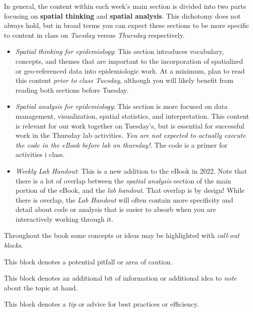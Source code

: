 \documentclass[
]{book}
\providecommand{\tightlist}{%
  \setlength{\itemsep}{0pt}\setlength{\parskip}{0pt}}
\newenvironment{rmdcaution}[1]
  {
  \begin{itemize}
  \renewcommand{\labelitemi}{
    \raisebox{-.7\height}[0pt][0pt]{
      {\setkeys{Gin}{width=3em,keepaspectratio}\texttt{[image: images/\#1]}}
    }
  }
  \setlength{\fboxsep}{1em}
  \begin{caution}
  \item
  }
  {
  \end{caution}
  \end{itemize}
  }
\newenvironment{rmdnote}[1]
  {
  \begin{itemize}
  \renewcommand{\labelitemi}{
    \raisebox{-.7\height}[0pt][0pt]{
      {\setkeys{Gin}{width=3em,keepaspectratio}\texttt{[image: images/\#1]}}
    }
  }
  \setlength{\fboxsep}{1em}
  \begin{note}
  \item
  }
  {
  \end{note}
  \end{itemize}
  }
\newenvironment{rmdtip}[1]
  {
  \begin{itemize}
  \renewcommand{\labelitemi}{
    \raisebox{-.7\height}[0pt][0pt]{
      {\setkeys{Gin}{width=3em,keepaspectratio}\texttt{[image: images/\#1]}}
    }
  }
  \setlength{\fboxsep}{1em}
  \begin{tip}
  \item
  }
  {
  \end{tip}
  \end{itemize}
  }
\begin{document}
In general, the content within each week's main section is divided into two parts focusing on \textbf{spatial thinking} and \textbf{spatial analysis}. This dichotomy does not always hold, but in broad terms you can expect these sections to be more specific to content in class on \emph{Tuesday} versus \emph{Thursday} respectively.

\begin{itemize}
\tightlist
\item
  \emph{Spatial thinking for epidemiology}: This section introduces vocabulary, concepts, and themes that are important to the incorporation of spatialized or geo-referenced data into epidemiologic work. At a minimum, plan to read this content \emph{prior to class Tuesday}, although you will likely benefit from reading both sections before Tuesday.
\item
  \emph{Spatial analysis for epidemiology}: This section is more focused on data management, visualization, spatial statistics, and interpretation. This content is relevant for our work together on Tuesday's, but is essential for successful work in the Thursday lab activities. \emph{You are not expected to actually execute the code in the eBook before lab on thursday!}. The code is a primer for activities i class.
\item
  \emph{Weekly Lab Handout}: This is a new addition to the eBook in 2022. Note that there is a lot of overlap between the \emph{spatial analysis} section of the main portion of the eBook, and the \emph{lab handout}. That overlap is by design! While there is overlap, the \emph{Lab Handout} will often contain more specificity and detail about code or analysis that is easier to absorb when you are interactively working through it.
\end{itemize}

Throughout the book some concepts or ideas may be highlighted with \emph{call-out blocks}.

\begin{rmdcaution}{caution}
This block denotes a potential pitfall or area of caution.

\end{rmdcaution}

\begin{rmdnote}{note}
This block denotes an additional bit of information or additional idea to \emph{note} about the topic at hand.

\end{rmdnote}

\begin{rmdtip}{tip}
This block denotes a \emph{tip} or advice for best practices or efficiency.

\end{rmdtip}
\end{document}
